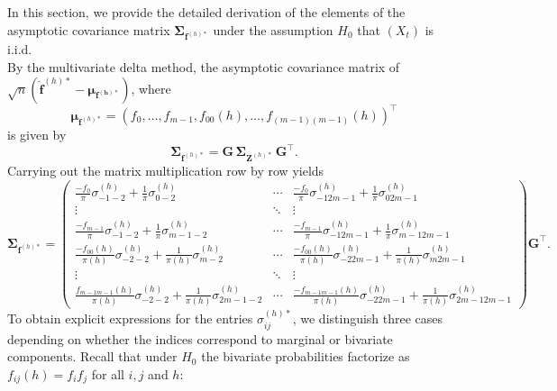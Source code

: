 ﻿\documentclass[12pt,a4paper]{scrreprt}
\theoremstyle{definition}
\begin{document}
\begin{appendices}
In this section, we provide the detailed derivation of the elements of 
the asymptotic covariance matrix 
$\boldsymbol{\Sigma}_{\boldsymbol{f}^{(h)*}}$ under the assumption $H_0$ that $(X_t)$ is i.i.d.\\
By the multivariate delta method, the asymptotic covariance matrix of 
$\sqrt{n}(\hat{\boldsymbol{f}}^{(h)*} - \boldsymbol{\mu_{\boldsymbol{f}^{(h)*}}})$, 
where 
\[\boldsymbol{\mu}_{\boldsymbol{f}^{(h)*}} = (f_0, \ldots, f_{m-1}, f_{00}(h), \ldots, f_{(m-1)(m-1)}(h))^{\top} \]
is given by 
\[
\boldsymbol{\Sigma}_{\boldsymbol{f}^{(h)*}} 
= \boldsymbol{G}\,\boldsymbol{\Sigma}_{\boldsymbol{Z}^{(h)*}}\,\boldsymbol{G}^\top.
\]
Carrying out the matrix multiplication row by row yields
\[
\boldsymbol{\Sigma}_{\boldsymbol{f}^{(h)*}} 
=
\begin{pmatrix}
\frac{- f_0}{\pi} \sigma^{(h)}_{-1-2} + \frac{1}{\pi} \sigma^{(h)}_{0-2} & \cdots & \frac{-f_0}{\pi} \sigma^{(h)}_{-12m-1} +  \frac{1}{\pi} \sigma^{(h)}_{02m-1} \\
\vdots &\ddots & \vdots \\
\frac{-f_{m-1}}{\pi} \sigma^{(h)}_{-1-2} + \frac{1}{\pi} \sigma^{(h)}_{m-1-2} & \cdots & \frac{-f_{m-1}}{\pi} \sigma^{(h)}_{-12m-1} +  \frac{1}{\pi} \sigma^{(h)}_{m-12m-1} \\
\frac{-f_{00}(h)}{\pi(h)} \sigma^{(h)}_{-2-2} + \frac{1}{\pi(h)} \sigma^{(h)}_{m-2} & \cdots & \frac{-f_{00}(h)}{\pi(h)} \sigma^{(h)}_{-22m-1} +  \frac{1}{\pi(h)} \sigma^{(h)}_{m2m-1} \\
\vdots &\ddots& \vdots \\
\frac{f_{m-1m-1}(h)}{\pi(h)} \sigma^{(h)}_{-2-2} + \frac{1}{\pi(h)} \sigma^{(h)}_{2m-1-2} & \cdots & \frac{-f_{m-1m-1}(h)}{\pi(h)} \sigma^{(h)}_{-22m-1} +  \frac{1}{\pi(h)} \sigma^{(h)}_{2m-12m-1}
\end{pmatrix}
\boldsymbol{G}^\top.
\]
To obtain explicit expressions for the entries 
$\sigma^{(h)*}_{ij}$, we distinguish three cases depending on whether 
the indices correspond to marginal or bivariate components. Recall that under $H_0$ 
the bivariate probabilities factorize as $f_{ij}(h) = f_i f_j$ for all $i,j$ and $h$:


\end{appendices}
\end{document}
